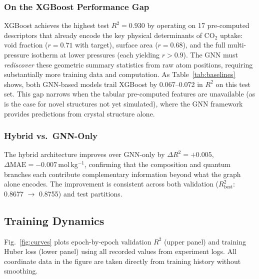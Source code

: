 \documentclass[conference]{IEEEtran}
\begin{document}
\subsubsection{On the XGBoost Performance Gap}
XGBoost achieves the highest test $R^2=0.930$ by operating on 17
pre-computed descriptors that already encode the key physical determinants
of CO$_2$ uptake: void fraction ($r=0.71$ with target), surface area ($r=0.68$),
and the full multi-pressure isotherm at lower pressures (each yielding $r>0.9$).
The GNN must \emph{rediscover} these geometric summary statistics from raw
atom positions, requiring substantially more training data and computation.
As Table~\ref{tab:baselines} shows, both GNN-based models trail XGBoost by
0.067--0.072 in $R^2$ on this test set.  This gap narrows when the tabular
pre-computed features are unavailable (as is the case for novel structures
not yet simulated), where the GNN framework provides predictions from
crystal structure alone.

\subsubsection{Hybrid vs.\ GNN-Only}
The hybrid architecture improves over GNN-only by $\Delta R^2=+0.005$,
$\Delta\text{MAE}=-0.007$\,mol\,kg$^{-1}$, confirming that the composition
and quantum branches each contribute complementary information beyond what
the graph alone encodes.  The improvement is consistent across both
validation ($R^2_{\text{best}}$: 0.8677 $\to$ 0.8755) and test partitions.

\subsection{Training Dynamics}
\label{sec:dynamics}

Fig.~\ref{fig:curves} plots epoch-by-epoch validation $R^2$ (upper panel)
and training Huber loss (lower panel) using all recorded values from
experiment logs.  All coordinate data in the figure are taken directly from
training history without smoothing.
\end{document}
